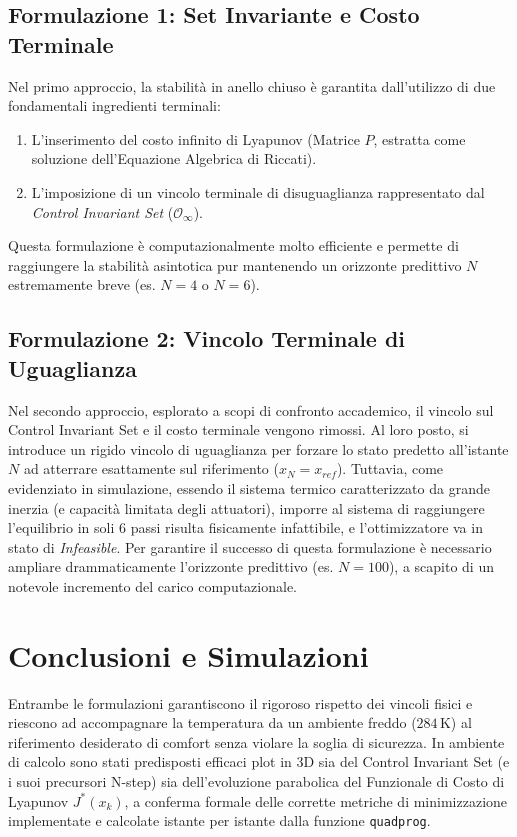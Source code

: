 \documentclass[12pt,a4paper]{article}
\begin{document}
\subsection{Formulazione 1: Set Invariante e Costo Terminale}
Nel primo approccio, la stabilit\`a in anello chiuso \`e garantita dall'utilizzo di due fondamentali ingredienti terminali:
\begin{enumerate}
    \item L'inserimento del costo infinito di Lyapunov (Matrice $P$, estratta come soluzione dell'Equazione Algebrica di Riccati).
    \item L'imposizione di un vincolo terminale di disuguaglianza rappresentato dal \textit{Control Invariant Set} ($\mathcal{O}_\infty$).
\end{enumerate}
Questa formulazione \`e computazionalmente molto efficiente e permette di raggiungere la stabilit\`a asintotica pur mantenendo un orizzonte predittivo $N$ estremamente breve (es. $N=4$ o $N=6$).

\subsection{Formulazione 2: Vincolo Terminale di Uguaglianza}
Nel secondo approccio, esplorato a scopi di confronto accademico, il vincolo sul Control Invariant Set e il costo terminale vengono rimossi. Al loro posto, si introduce un rigido vincolo di uguaglianza per forzare lo stato predetto all'istante $N$ ad atterrare esattamente sul riferimento ($x_N = x_{ref}$).
Tuttavia, come evidenziato in simulazione, essendo il sistema termico caratterizzato da grande inerzia (e capacit\`a limitata degli attuatori), imporre al sistema di raggiungere l'equilibrio in soli 6 passi risulta fisicamente infattibile, e l'ottimizzatore va in stato di \textit{Infeasible}. Per garantire il successo di questa formulazione \`e necessario ampliare drammaticamente l'orizzonte predittivo (es. $N=100$), a scapito di un notevole incremento del carico computazionale.

\section{Conclusioni e Simulazioni}
Entrambe le formulazioni garantiscono il rigoroso rispetto dei vincoli fisici e riescono ad accompagnare la temperatura da un ambiente freddo ($284$\,K) al riferimento desiderato di comfort senza violare la soglia di sicurezza. In ambiente di calcolo sono stati predisposti efficaci plot in 3D sia del Control Invariant Set (e i suoi precursori N-step) sia dell'evoluzione parabolica del Funzionale di Costo di Lyapunov $J^*(x_k)$, a conferma formale delle corrette metriche di minimizzazione implementate e calcolate istante per istante dalla funzione \texttt{quadprog}.
\end{document}

